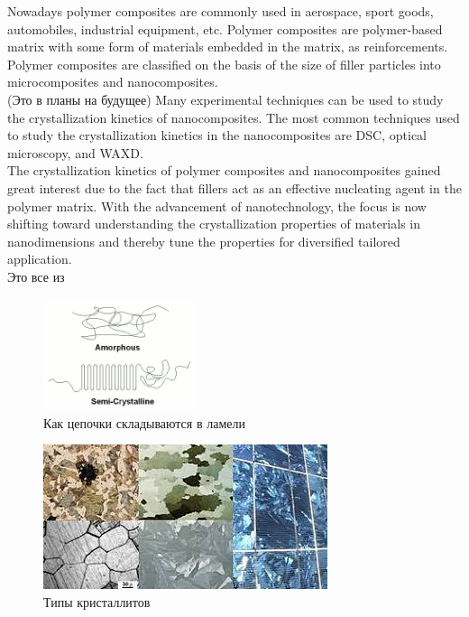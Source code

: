 Nowadays polymer composites are commonly used in aerospace, sport goods, automobiles,
industrial equipment, etc. Polymer composites are polymer-based matrix
with some form of materials embedded in the matrix, as reinforcements.\\
Polymer composites are classified on the basis of the size of filler particles into
microcomposites and nanocomposites.\\
(Это в планы на будущее)
Many experimental techniques can be used to study the crystallization
kinetics of nanocomposites. The most common techniques used to study the
crystallization kinetics in the nanocomposites are DSC, optical microscopy, and
WAXD.\\
The crystallization
kinetics of polymer composites and nanocomposites gained great interest due to the
fact that fillers act as an effective nucleating agent in the polymer matrix. With the
advancement of nanotechnology, the focus is now shifting toward understanding
the crystallization properties of materials in nanodimensions and thereby tune the
properties for diversified tailored application.\\

Это все из \cite{cryst1}

	\begin{figure} 
\vspace{-20pt}


  \begin{center}
    \includegraphics[width=0.4\textwidth]{fig/crystal-1.png}
    \caption{Как цепочки складываются в ламели}
    \label{fig:crystal-1}
  \end{center}
  \vspace{-20pt}
  \vspace{1pt}
\end{figure}



\begin{figure}[h]
    \includegraphics[width=\textwidth]{fig/crystallites.jpg}
    \caption{Типы кристаллитов}
    \label{fig:crystallites}
\end{figure}



